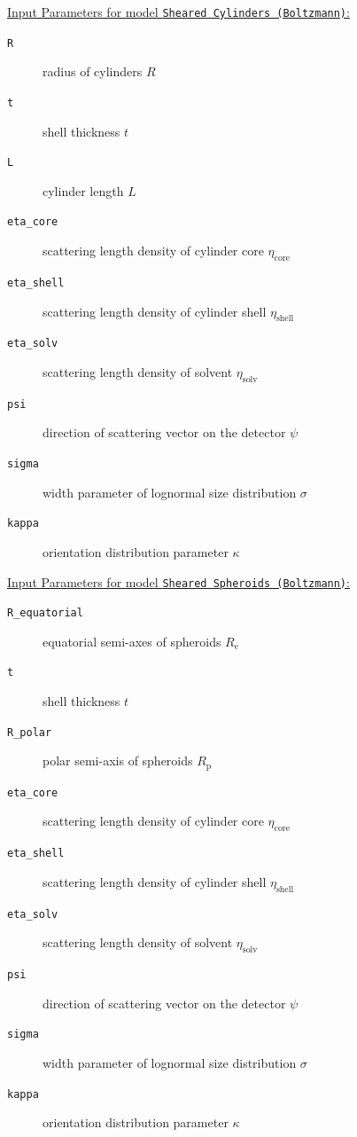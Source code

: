 \vspace{5mm}

\uline{Input Parameters for model \texttt{Sheared Cylinders (Boltzmann)}:}\\
\begin{description}
\item[\texttt{R}] radius of cylinders $R$
\item[\texttt{t}] shell thickness $t$
\item[\texttt{L}] cylinder length $L$
\item[\texttt{eta\_core}] scattering length density of cylinder core $\eta_\mathrm{core}$
\item[\texttt{eta\_shell}] scattering length density of cylinder shell $\eta_\mathrm{shell}$
\item[\texttt{eta\_solv}] scattering length density of solvent $\eta_\mathrm{solv}$
\item[\texttt{psi}] direction of scattering vector on the detector $\psi$
\item[{\texttt{sigma}}] width parameter of lognormal size distribution $\sigma$
\item[{\texttt{kappa}}] orientation distribution parameter $\kappa$
\end{description}

\vspace{5mm}

\uline{Input Parameters for model \texttt{Sheared Spheroids (Boltzmann)}:}\\
\begin{description}
\item[\texttt{R\_equatorial}] equatorial semi-axes of spheroids $R_\mathrm{e}$
\item[\texttt{t}] shell thickness $t$
\item[\texttt{R\_polar}] polar semi-axis of spheroids $R_\mathrm{p}$
\item[\texttt{eta\_core}] scattering length density of cylinder core $\eta_\mathrm{core}$
\item[\texttt{eta\_shell}] scattering length density of cylinder shell $\eta_\mathrm{shell}$
\item[\texttt{eta\_solv}] scattering length density of solvent $\eta_\mathrm{solv}$
\item[\texttt{psi}] direction of scattering vector on the detector $\psi$
\item[{\texttt{sigma}}] width parameter of lognormal size distribution $\sigma$
\item[{\texttt{kappa}}] orientation distribution parameter $\kappa$
\end{description}

